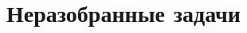 \documentclass[10pt, a4paper, oneside]{book}
\begin{document}
	\chapter*{Неразобранные задачи}
\end{document}
